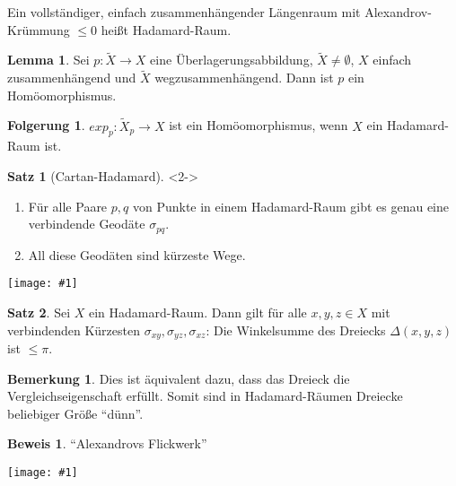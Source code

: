 \documentclass{beamer}
\renewcommand{\emph}[1]{\textcolor{Emph}{#1}}
\theoremstyle{definition}
\newtheorem*{satz}{Satz}
\newtheorem*{lem}{Lemma}
\newtheorem*{bem}{Bemerkung}
\newtheorem*{folg}{Folgerung}
\newtheorem*{bew}{Beweis}
\newcommand{\framedgraphic}[1] {
  \begin{frame}
    \begin{center}
      \vspace{-10pt}
      \texttt{[image: \#1]}
    \end{center}
  \end{frame}
}
\begin{document}
\begin{frame}
  \begin{definition}
    Ein vollständiger, einfach zusammenhängender Längenraum mit Alexandrov-Krümmung $\leq 0$ heißt \emph{Hadamard-Raum}.
  \end{definition}

  \begin{lem}
    Sei $p : \tilde{X} \to X$ eine Überlagerungsabbildung, $\tilde{X} \not= \emptyset$, $X$ einfach zusammenhängend und $\tilde{X}$ wegzusammenhängend. Dann ist $p$ ein Homöomorphismus.
  \end{lem}

  \begin{folg}
    $exp_p : \tilde{X}_p \to X$ ist ein Homöomorphismus, wenn $X$ ein Hadamard-Raum ist.
  \end{folg}

  \begin{satz}[Cartan-Hadamard]<2->
    \begin{enumerate}
      \item Für alle Paare $p, q$ von Punkte in einem Hadamard-Raum gibt es genau eine verbindende Geodäte $\sigma_{pq}$.
      \item All diese Geodäten sind kürzeste Wege.
    \end{enumerate}
  \end{satz}
\end{frame}


\framedgraphic{bilder/Picture15.jpg}

\begin{frame}
  \begin{satz}
    Sei $X$ ein Hadamard-Raum. Dann gilt für alle $x, y, z \in X$ mit verbindenden Kürzesten $\sigma_{xy}, \sigma_{yz}, \sigma_{xz}$: Die Winkelsumme des Dreiecks $\Delta (x, y, z)$ ist $\leq \pi$.
  \end{satz}

  \begin{bem}
    Dies ist äquivalent dazu, dass das Dreieck die Vergleichseigenschaft erfüllt. Somit sind in Hadamard-Räumen Dreiecke beliebiger Größe "`dünn"'.
  \end{bem}

  \begin{bew}
    "`Alexandrovs Flickwerk"'
  \end{bew}
\end{frame}

\framedgraphic{bilder/cat.jpg}
\end{document}
